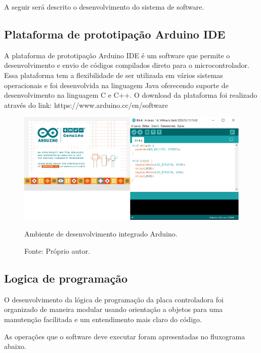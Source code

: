 A seguir será descrito o desenvolvimento do sistema de software.

\subsection{Plataforma de prototipação Arduino IDE}\label{subsec:metide}

A plataforma de prototipação Arduino \ac{IDE} é um software que permite o desenvolvimento e envio 
de códigos compilados direto para o microcontrolador. Essa plataforma tem a flexibilidade de 
ser utilizada em vários sistemas operacionais e foi desenvolvida na linguagem Java oferecendo 
suporte de desenvolvimento na linguagem C e C++. O download da plataforma foi realizado 
através do link: https://www.arduino.cc/en/software

\begin{figure}[H]
\centering
\includegraphics[width = 1\linewidth]{figuras/idearduino}
\caption{Ambiente de desenvolvimento integrado Arduino.}
\caption*{Fonte: Próprio autor.}
\label{fig:idearduino}
\end{figure}
    
\subsection{Logica de programação}\label{subsec:metlogica}

O desenvolvimento da lógica de programação da placa controladora foi organizado de maneira modular 
usando orientação a objetos para uma manutenção facilitada e um entendimento mais claro do código.

As operações que o software deve executar foram apresentadas no fluxograma abaixo.


